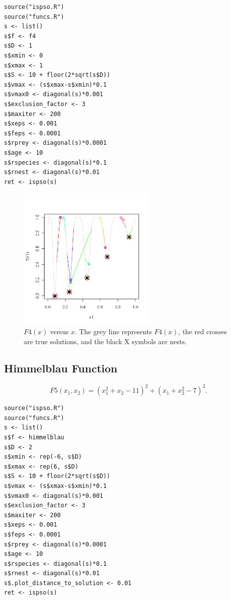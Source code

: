 \documentclass{article}
\begin{document}
\begin{verbatim}
source("ispso.R")
source("funcs.R")
s <- list()
s$f <- f4
s$D <- 1
s$xmin <- 0
s$xmax <- 1
s$S <- 10 + floor(2*sqrt(s$D))
s$vmax <- (s$xmax-s$xmin)*0.1
s$vmax0 <- diagonal(s)*0.001
s$exclusion_factor <- 3
s$maxiter <- 200
s$xeps <- 0.001
s$feps <- 0.0001
s$rprey <- diagonal(s)*0.0001
s$age <- 10
s$rspecies <- diagonal(s)*0.1
s$rnest <- diagonal(s)*0.01
ret <- ispso(s)
\end{verbatim}

\begin{figure}[htbp]
  \centering
  \includegraphics[width=0.6\textwidth]{f4.png}
  \caption{$F4(x)$ versus $x$. The grey line represents $F4(x)$, the red crosses are true solutions, and the black X symbols are nests.}
\end{figure}

\subsection{Himmelblau Function}

\begin{equation*}
  F5(x_1, x_2)=(x_1^2+x_2-11)^2+(x_1+x_2^2-7)^2.
\end{equation*}

\begin{verbatim}
source("ispso.R")
source("funcs.R")
s <- list()
s$f <- himmelblau
s$D <- 2
s$xmin <- rep(-6, s$D)
s$xmax <- rep(6, s$D)
s$S <- 10 + floor(2*sqrt(s$D))
s$vmax <- (s$xmax-s$xmin)*0.1
s$vmax0 <- diagonal(s)*0.001
s$exclusion_factor <- 3
s$maxiter <- 200
s$xeps <- 0.001
s$feps <- 0.0001
s$rprey <- diagonal(s)*0.0001
s$age <- 10
s$rspecies <- diagonal(s)*0.1
s$rnest <- diagonal(s)*0.01
s$.plot_distance_to_solution <- 0.01
ret <- ispso(s)
\end{verbatim}
\end{document}
